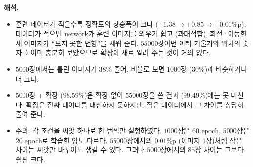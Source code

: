 \documentclass[11pt,a4paper]{article}
\begin{document}
\begin{problems}
\begin{sol}
\textbf{해석.}
\begin{itemize}[leftmargin=1.5em,itemsep=2pt]
\item 훈련 데이터가 적을수록 정확도의 상승폭이 크다 ($+1.38\to+0.85\to+0.01\%$p).
데이터가 적으면 network가 훈련 이미지를 외우기 쉽고 (과대적합), 회전·이동한 새 이미지가 ``보지 못한 변형''을 채워 준다.
$55000$장이면 여러 기울기와 위치의 숫자를 이미 충분히 보았으므로 확장이 새로 알려 주는 것이 거의 없다.
\item $5000$장에서는 틀린 이미지가 $38\%$ 줄어, 비율로 보면 $1000$장 ($30\%$)과 비슷하거나 더 크다.
\item $5000$장 $+$ 확장 ($98.59\%$)은 확장 없이 $55000$장을 쓴 결과 ($99.49\%$)에는 못 미친다. 확장은 진짜 데이터를 대신하지 못하지만, 적은 데이터에서 그 차이를 상당히 줄여 준다.
\item 주의: 각 조건을 씨앗 하나로 한 번씩만 실행하였다. $1000$장은 $60$ epoch, $5000$장은 $20$ epoch로 학습한 양도 다르다.
$55000$장에서의 $0.01\%$p (이미지 $1$장)처럼 작은 차이는 씨앗만 바꾸어도 생길 수 있다. 그러나 $5000$장에서의 $85$장 차이는 그보다 훨씬 크다.
\end{itemize}
\end{sol}

\end{problems}
\end{document}
